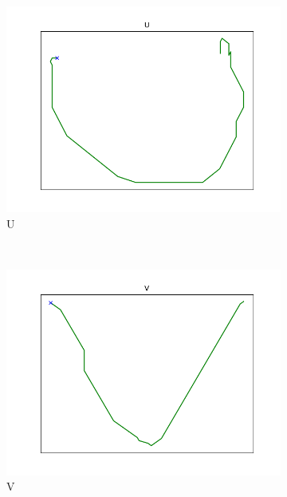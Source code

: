 \begin{figure}
\begin{subfigure}[b]{0.14\textwidth}
        \includegraphics[width=\textwidth]{images/gbem/orig_letters_fig/AORIG_letter_U_writer_5.png}
        \caption{U}
    \end{subfigure}
    ~
    \begin{subfigure}[b]{0.14\textwidth}
        \includegraphics[width=\textwidth]{images/gbem/orig_letters_fig/AORIG_letter_V_writer_11.png}
        \caption{V}
    \end{subfigure}
    ~
    \begin{subfigure}[b]{0.14\textwidth}

\end{subfigure}
\end{figure}
